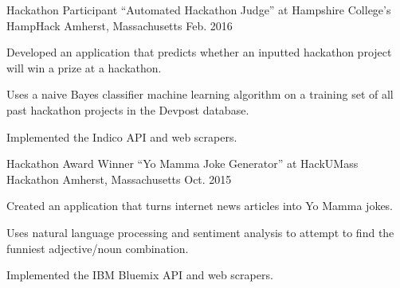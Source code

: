 \begin{cventries}
  \cventry
    {Hackathon Participant}
    {“Automated Hackathon Judge” at Hampshire College’s HampHack}
    {Amherst, Massachusetts}
    {Feb. 2016}
    {
      \begin{cvitems}
        \item {Developed an application that predicts whether an inputted hackathon project will win a prize at a hackathon.}
        \item {Uses a naive Bayes classifier machine learning algorithm on a training set of all past hackathon projects in the Devpost database.}
        \item {Implemented the Indico API and web scrapers.}
      \end{cvitems}
    }
  \cventry
    {Hackathon Award Winner}
    {“Yo Mamma Joke Generator” at HackUMass Hackathon}
    {Amherst, Massachusetts}
    {Oct. 2015}
    {
      \begin{cvitems}
        \item {Created an application that turns internet news articles into Yo Mamma jokes.}
        \item {Uses natural language processing and sentiment analysis to attempt to find the funniest adjective/noun combination.} 
        \item {Implemented the IBM Bluemix API and web scrapers.}
      \end{cvitems}
    }
\end{cventries}
